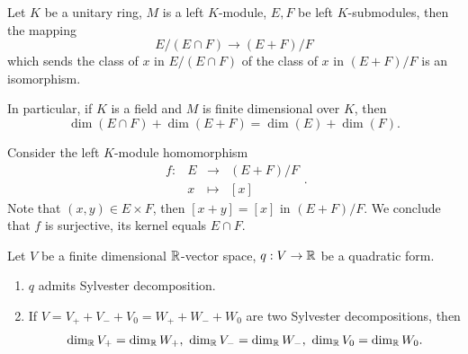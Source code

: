 \begin{propositionenv}
    Let $K$ be a unitary ring, $M$ is a left $K$-module, $E,F$ be left $K$-submodules, then the mapping
    $$ E/(E\cap F )\rightarrow (E+F)/ F$$
    which sends the class of $x$ in $E/(E\cap F)$ of the class of $x$ in $(E+F)/F$ is an isomorphism. 
    
    \quad In particular, if $K$ is a field and $M$ is finite dimensional over $K$, then
    $$ \dim \left(E\cap F\right) + \dim \left(E+F\right) = \dim\left(E\right) + \dim \left(F\right).$$
\end{propositionenv}
\begin{proofenv}
    Consider the left $K$-module homomorphism
    $$ \begin{array}{rrcl}
        f: & E & \rightarrow & (E+F)/F\\
        & x & \mapsto & [x]
    \end{array}.$$
    Note that $(x,y)\in E\times F$, then $[x+y] = [x]$ in $(E+F)/F$.
    We conclude that $f$ is surjective, its kernel equals $E\cap F$.
\end{proofenv}
\begin{theoremenv}
    Let $V$ be a finite dimensional $\mathbb{R}$-vector space, $q : V\rightarrow \mathbb{R}$ be a quadratic form.
    \begin{enumerate}
        \item $q$ admits Sylvester decomposition.
        \item If $V = V_+ + V_- +V_0 = W_+ +W_- + W_0$ are two Sylvester decompositions, then
        $$ \dim_{\mathbb{R}} V_+ = \dim_{\mathbb{R}} W_+,\ \dim_{\mathbb{R}} V_- = \dim_{\mathbb{R}} W_-,\ \dim_{\mathbb{R}} V_0 = \dim_{\mathbb{R}} W_0.$$
    \end{enumerate}
\end{theoremenv}
